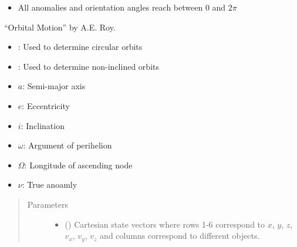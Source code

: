 \documentclass[letterpaper,10pt,english]{sphinxmanual}
\begin{document}
\begin{fulllineitems}
\begin{description}
\begin{itemize}
\item {} 
All anomalies and orientation angles reach between 0 and \(2\pi\)

\end{itemize}

 “Orbital Motion” by A.E. Roy.

\item[{\sphinxstylestrong{Constants:}}] \leavevmode\begin{itemize}
\item {} 
{\hyperref[\detokenize{modules/dpt_tools:dpt_tools.e_lim}]{}}: Used to determine circular orbits

\item {} 
{\hyperref[\detokenize{modules/dpt_tools:dpt_tools.i_lim}]{}}: Used to determine non-inclined orbits

\end{itemize}

\item[{\sphinxstylestrong{Variables:}}] \leavevmode\begin{itemize}
\item {} 
\(a\): Semi-major axis

\item {} 
\(e\): Eccentricity

\item {} 
\(i\): Inclination

\item {} 
\(\omega\): Argument of perihelion

\item {} 
\(\Omega\): Longitude of ascending node

\item {} 
\(\nu\): True anoamly

\end{itemize}

\end{description}
\begin{quote}\begin{description}
\item[{Parameters}] \leavevmode\begin{itemize}
\item {} 
 () \textendash{} Cartesian state vectors where rows 1-6 correspond to \(x\), \(y\), \(z\), \(v_x\), \(v_y\), \(v_z\) and columns correspond to different objects.


\end{itemize}
\end{description}
\end{quote}
\end{fulllineitems}
\end{document}
